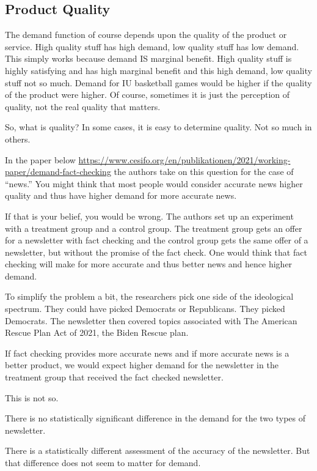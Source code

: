 \documentclass[
]{book}
\begin{document}
\hypertarget{product-quality}{%
\subsection{Product Quality}\label{product-quality}}

The demand function of course depends upon the quality of the product or service. High quality stuff has high demand, low quality stuff has low demand. This simply works because demand IS marginal benefit. High quality stuff is highly satisfying and has high marginal benefit and this high demand, low quality stuff not so much. Demand for IU basketball games would be higher if the quality of the product were higher. Of course, sometimes it is just the perception of quality, not the real quality that matters.

So, what is quality? In some cases, it is easy to determine quality. Not so much in others.

In the paper below
\url{https://www.cesifo.org/en/publikationen/2021/working-paper/demand-fact-checking}
the authors take on this question for the case of ``news.'' You might think that most people would consider accurate news higher quality and thus have higher demand for more accurate news.

If that is your belief, you would be wrong.
The authors set up an experiment with a treatment group and a control group. The treatment group gets an offer for a newsletter with fact checking and the control group gets the same offer of a newsletter, but without the promise of the fact check. One would think that fact checking will make for more accurate and thus better news and hence higher demand.

To simplify the problem a bit, the researchers pick one side of the ideological spectrum. They could have picked Democrats or Republicans. They picked Democrats. The newsletter then covered topics associated with The American Rescue Plan Act of 2021, the Biden Rescue plan.

If fact checking provides more accurate news and if more accurate news is a better product, we would expect higher demand for the newsletter in the treatment group that received the fact checked newsletter.

This is not so.

There is no statistically significant difference in the demand for the two types of newsletter.

There is a statistically different assessment of the accuracy of the newsletter. But that difference does not seem to matter for demand.
\end{document}

